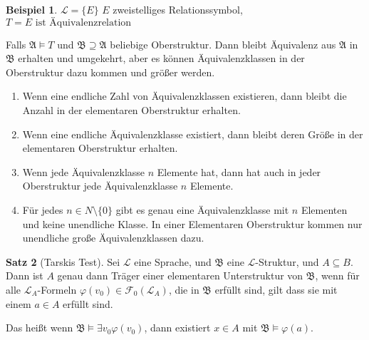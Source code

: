 \documentclass[12pt,parskip=full]{scrartcl}
\theoremstyle{definition}
\newtheorem{theorem}{Satz}[section]
\newtheorem{example}[theorem]{Beispiel}
\begin{document}
	\begin{example}
		$\mathcal{L} = \{ E \}$ $E$ zweistelliges Relationssymbol, $T = \text{$E$ ist Äquivalenzrelation}$
		
		Falls $\mathfrak{A} \models T$ und $\mathfrak{B} \supseteq \mathfrak{A}$ beliebige Oberstruktur. Dann bleibt Äquivalenz aus $\mathfrak{A}$ in $\mathfrak{B}$ erhalten und umgekehrt, aber es können Äquivalenzklassen in der Oberstruktur dazu kommen und größer werden.
		
		\begin{enumerate}
			\item Wenn eine endliche Zahl von Äquivalenzklassen existieren, dann bleibt die Anzahl in der elementaren Oberstruktur erhalten.
			\item Wenn eine endliche Äquivalenzklasse existiert, dann bleibt deren Größe in der elementaren Oberstruktur erhalten.
			\item Wenn jede Äquivalenzklasse $n$ Elemente hat, dann hat auch in jeder Oberstruktur jede Äquivalenzklasse $n$ Elemente.
			\item Für jedes $n \in N \setminus \{ 0 \}$ gibt es genau eine Äquivalenzklasse mit $n$ Elementen und keine unendliche Klasse. In einer Elementaren Oberstruktur kommen nur unendliche große Äquivalenzklassen dazu.
		\end{enumerate}
	\end{example}

	\begin{theorem}[Tarskis Test]
		Sei $\mathcal{L}$ eine Sprache, und $\mathfrak{B}$ eine $\mathcal{L}$-Struktur, und $A \subseteq B$. Dann ist $A$ genau dann Träger einer elementaren Unterstruktur von $\mathfrak{B}$, wenn für alle $\mathcal{L}_A$-Formeln $\varphi(v_0) \in \mathcal{F}_0(\mathcal{L}_A)$, die in $\mathfrak{B}$ erfüllt sind, gilt dass sie mit einem $a \in A$ erfüllt sind.
		
		Das heißt wenn $\mathfrak{B} \models \exists v_0 \varphi(v_0)$, dann existiert $x \in A$ mit $\mathfrak{B} \models \varphi(a)$.
	\end{theorem}
\end{document}
